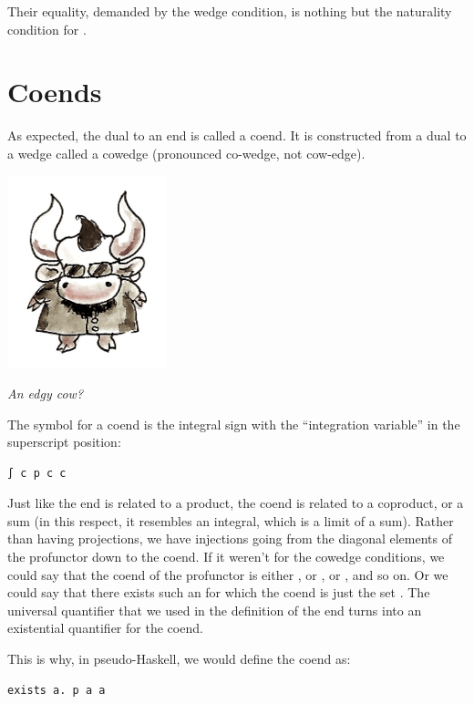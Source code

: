 Their equality, demanded by the wedge condition, is nothing but the
naturality condition for .

\section{Coends}\label{coends}

As expected, the dual to an end is called a coend. It is constructed
from a dual to a wedge called a cowedge (pronounced co-wedge, not
cow-edge).

\hypertarget{attachment_8533}{}
\includegraphics[width=1.82292in]{images/end-31.jpg}

\emph{An edgy cow?}

The symbol for a coend is the integral sign with the ``integration
variable'' in the superscript position:

\begin{verbatim}
∫ c p c c
\end{verbatim}

Just like the end is related to a product, the coend is related to a
coproduct, or a sum (in this respect, it resembles an integral, which is
a limit of a sum). Rather than having projections, we have injections
going from the diagonal elements of the profunctor down to the coend. If
it weren't for the cowedge conditions, we could say that the coend of
the profunctor  is either , or
, or , and so on. Or we could say that
there exists such an  for which the coend is just the set
. The universal quantifier that we used in the
definition of the end turns into an existential quantifier for the
coend.

This is why, in pseudo-Haskell, we would define the coend as:

\begin{verbatim}
exists a. p a a
\end{verbatim}

